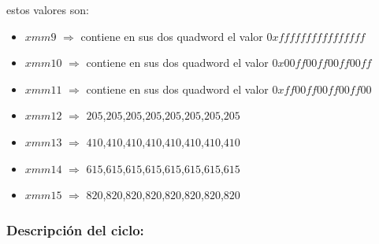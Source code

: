 estos valores son:
\begin{itemize}
  	\item $xmm9$ $\Rightarrow$ contiene en sus dos quadword el valor $0xffffffffffffffff$
	\item $xmm10$ $\Rightarrow$ contiene en sus dos quadword el valor $0x00ff00ff00ff00ff$
	\item $xmm11$ $\Rightarrow$ contiene en sus dos quadword el valor $0xff00ff00ff00ff00$
	\item $xmm12$ $\Rightarrow$ $205$,$205$,$205$,$205$,$205$,$205$,$205$,$205$
	\item $xmm13$ $\Rightarrow$ $410$,$410$,$410$,$410$,$410$,$410$,$410$,$410$
	\item $xmm14$ $\Rightarrow$ $615$,$615$,$615$,$615$,$615$,$615$,$615$,$615$
	\item $xmm15$ $\Rightarrow$ $820$,$820$,$820$,$820$,$820$,$820$,$820$,$820$ 
\end{itemize}

\subsubsection{Descripción del ciclo:}

